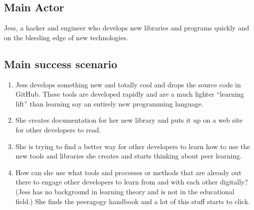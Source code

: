 \subsection{Main Actor}

Jess, a hacker and engineer who develops new libraries and programs
quickly and on the bleeding edge of new technologies.

\subsection{Main success scenario}

\begin{enumerate}
\item
  Jess develops something new and totally cool and drops the source code
  in GitHub. These tools are developed rapidly and are a much lighter
  ``learning lift'' than learning say an entirely new programming
  language.
\item
  She creates documentation for her new library and puts it up on a web
  site for other developers to read.
\item
  She is trying to find a better way for other developers to learn how
  to use the new tools and libraries she creates and starts thinking
  about peer learning.
\item
  How can she use what tools and processes or methods that are already
  out there to engage other developers to learn from and with each other
  digitally? (Jess has no background in learning theory and is not in
  the educational field.) She finds the peeragogy handbook and a lot of
  this stuff starts to click.
\end{enumerate}
